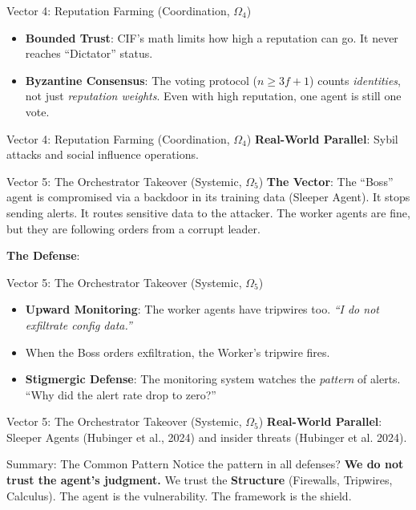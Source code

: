 \documentclass[
  ignorenonframetext,
]{beamer}
\providecommand{\tightlist}{%
  \setlength{\itemsep}{0pt}\setlength{\parskip}{0pt}}
\begin{document}
\begin{frame}[allowframebreaks]{Vector 4: Reputation Farming
(Coordination, \(\Omega_4\))}
\begin{itemize}
\tightlist
\item
  \textbf{Bounded Trust}: CIF's math limits how high a reputation can
  go. It never reaches ``Dictator'' status.
\item
  \textbf{Byzantine Consensus}: The voting protocol (\(n \ge 3f+1\))
  counts \emph{identities}, not just \emph{reputation weights}. Even
  with high reputation, one agent is still one vote.
\end{itemize}

\end{frame}

\begin{frame}[allowframebreaks]{Vector 4: Reputation Farming
(Coordination, \(\Omega_4\))}
\textbf{Real-World Parallel}: Sybil attacks and social influence
operations.
\end{frame}

\begin{frame}[allowframebreaks]{Vector 5: The Orchestrator Takeover
(Systemic, \(\Omega_5\))}
\protect{}\label{vector-5-the-orchestrator-takeover-systemic-omega_5}
\textbf{The Vector}: The ``Boss'' agent is compromised via a backdoor in
its training data (Sleeper Agent). It stops sending alerts. It routes
sensitive data to the attacker. The worker agents are fine, but they are
following orders from a corrupt leader.

\textbf{The Defense}:

\end{frame}

\begin{frame}[allowframebreaks]{Vector 5: The Orchestrator Takeover
(Systemic, \(\Omega_5\))}
\begin{itemize}
\tightlist
\item
  \textbf{Upward Monitoring}: The worker agents have tripwires too.
  \emph{``I do not exfiltrate config data.''}
\item
  When the Boss orders exfiltration, the Worker's tripwire fires.
\item
  \textbf{Stigmergic Defense}: The monitoring system watches the
  \emph{pattern} of alerts. ``Why did the alert rate drop to zero?''
\end{itemize}

\end{frame}

\begin{frame}[allowframebreaks]{Vector 5: The Orchestrator Takeover
(Systemic, \(\Omega_5\))}
\textbf{Real-World Parallel}: Sleeper Agents (Hubinger et al., 2024) and
insider threats ({Hubinger et al.} 2024).
\end{frame}

\begin{frame}[allowframebreaks]{Summary: The Common Pattern}
\protect{}\label{summary-the-common-pattern}
Notice the pattern in all defenses? \textbf{We do not trust the agent's
judgment.} We trust the \textbf{Structure} (Firewalls, Tripwires,
Calculus). The agent is the vulnerability. The framework is the shield.
\end{frame}
\end{document}
